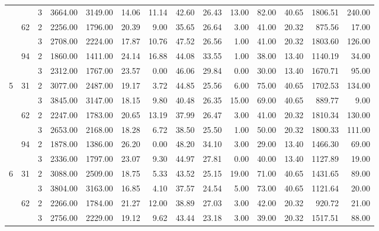\begin{tabular}{lllrrrrrrrrrrr}
  &    & 3 &  3664.00 &   3149.00 & 14.06 &   11.14 &   42.60 &   26.43 &   13.00 &   82.00 &   40.65 & 1806.51 &   240.00 \\
\cline{2-14}
  & \multirow{2}{*}{62} & 2 &  2256.00 &   1796.00 & 20.39 &    9.00 &   35.65 &   26.64 &    3.00 &   41.00 &   20.32 &  875.56 &    17.00 \\
  &    & 3 &  2708.00 &   2224.00 & 17.87 &   10.76 &   47.52 &   26.56 &    1.00 &   41.00 &   20.32 & 1803.60 &   126.00 \\
\cline{2-14}
  & \multirow{2}{*}{94} & 2 &  1860.00 &   1411.00 & 24.14 &   16.88 &   44.08 &   33.55 &    1.00 &   38.00 &   13.40 & 1140.19 &    34.00 \\
  &    & 3 &  2312.00 &   1767.00 & 23.57 &    0.00 &   46.06 &   29.84 &    0.00 &   30.00 &   13.40 & 1670.71 &    95.00 \\
\cline{1-14}
\cline{2-14}
\multirow{6}{*}{5} & \multirow{2}{*}{31} & 2 &  3077.00 &   2487.00 & 19.17 &    3.72 &   44.85 &   25.56 &    6.00 &   75.00 &   40.65 & 1702.53 &   134.00 \\
  &    & 3 &  3845.00 &   3147.00 & 18.15 &    9.80 &   40.48 &   26.35 &   15.00 &   69.00 &   40.65 &  889.77 &     9.00 \\
\cline{2-14}
  & \multirow{2}{*}{62} & 2 &  2247.00 &   1783.00 & 20.65 &   13.19 &   37.99 &   26.47 &    3.00 &   41.00 &   20.32 & 1810.34 &   130.00 \\
  &    & 3 &  2653.00 &   2168.00 & 18.28 &    6.72 &   38.50 &   25.50 &    1.00 &   50.00 &   20.32 & 1800.33 &   111.00 \\
\cline{2-14}
  & \multirow{2}{*}{94} & 2 &  1878.00 &   1386.00 & 26.20 &    0.00 &   48.20 &   34.10 &    3.00 &   29.00 &   13.40 & 1466.30 &    69.00 \\
  &    & 3 &  2336.00 &   1797.00 & 23.07 &    9.30 &   44.97 &   27.81 &    0.00 &   40.00 &   13.40 & 1127.89 &    19.00 \\
\cline{1-14}
\cline{2-14}
\multirow{6}{*}{6} & \multirow{2}{*}{31} & 2 &  3088.00 &   2509.00 & 18.75 &    5.33 &   43.52 &   25.15 &   19.00 &   71.00 &   40.65 & 1431.65 &    89.00 \\
  &    & 3 &  3804.00 &   3163.00 & 16.85 &    4.10 &   37.57 &   24.54 &    5.00 &   73.00 &   40.65 & 1121.64 &    20.00 \\
\cline{2-14}
  & \multirow{2}{*}{62} & 2 &  2266.00 &   1784.00 & 21.27 &   12.00 &   38.89 &   27.03 &    3.00 &   42.00 &   20.32 &  920.72 &    21.00 \\
  &    & 3 &  2756.00 &   2229.00 & 19.12 &    9.62 &   43.44 &   23.18 &    3.00 &   39.00 &   20.32 & 1517.51 &    88.00 \\

\end{tabular}
